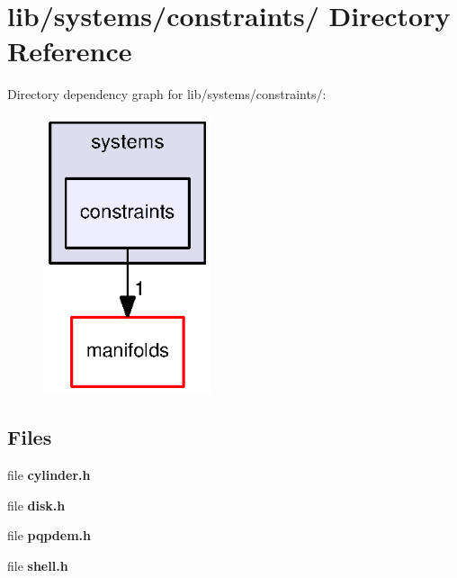 \section{lib/systems/constraints/ \-Directory \-Reference}
\label{dir_8d466be0d3e8c36514d653d27730561e}
\-Directory dependency graph for lib/systems/constraints/\-:
\nopagebreak
\begin{figure}[H]
\begin{center}
\leavevmode
\includegraphics[width=140pt]{dir_8d466be0d3e8c36514d653d27730561e_dep}
\end{center}
\end{figure}
\subsection*{\-Files}
\begin{DoxyCompactItemize}
\item 
file {\bf cylinder.\-h}
\item 
file {\bf disk.\-h}
\item 
file {\bf pqpdem.\-h}
\item 
file {\bf shell.\-h}
\end{DoxyCompactItemize}

